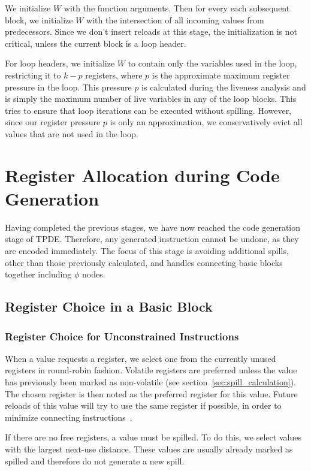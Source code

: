 We initialize $W$ with the function arguments. Then for every each subsequent block, we initialize $W$ with the intersection of all incoming values from predecessors. Since we don't insert reloads at this stage, the initialization is not critical, unless the current block is a loop header.

For loop headers, we initialize $W$ to contain only the variables used in the loop, restricting it to $k-p$ registers, where $p$ is the approximate maximum register pressure in the loop. This pressure $p$ is calculated during the liveness analysis and is simply the maximum number of live variables in any of the loop blocks. 
This tries to ensure that loop iterations can be executed without spilling. 
However, since  our register pressure $p$ is only an approximation, we conservatively evict all values that are not used in the loop.

\section{Register Allocation during Code Generation}

Having completed the previous stages, we have now reached the code generation stage of TPDE. Therefore, any generated instruction cannot be undone, as they are encoded immediately. 
The focus of this stage is avoiding additional spills, other than those previously calculated, and handles connecting basic blocks together including $\phi$ nodes.

\subsection{Register Choice in a Basic Block}
\subsubsection{Register Choice for Unconstrained Instructions}
When a value requests a register, we select one from the currently unused registers in round-robin fashion. Volatile registers are preferred unless the value has previously been marked as non-volatile (see section~\ref{sec:spill_calculation}).
The chosen register is then noted as the preferred register for this value. Future reloads of this value will try to use the same register if possible, in order to minimize connecting instructions~\cite{treescan}.

If there are no free registers, a value must be spilled. To do this, we select values with the largest next-use distance. These values are usually already marked as spilled and therefore do not generate a new spill.
